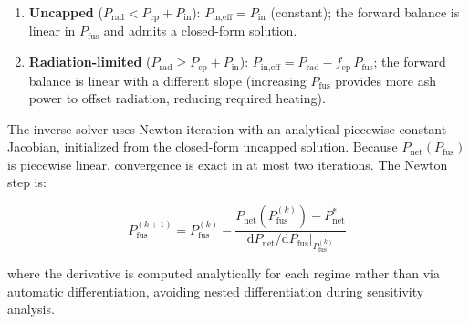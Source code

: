 \documentclass{article}
\begin{document}
\begin{enumerate}
\item \textbf{Uncapped} ($P_{\text{rad}} < P_{\text{cp}} + P_{\text{in}}$):
  $P_{\text{in,eff}} = P_{\text{in}}$ (constant); the forward balance
  is linear in $P_{\text{fus}}$ and admits a closed-form solution.
\item \textbf{Radiation-limited} ($P_{\text{rad}} \geq P_{\text{cp}} + P_{\text{in}}$):
  $P_{\text{in,eff}} = P_{\text{rad}} - f_{\text{cp}}\,P_{\text{fus}}$;
  the forward balance is linear with a different slope (increasing
  $P_{\text{fus}}$ provides more ash power to offset radiation, reducing
  required heating).
\end{enumerate}

\noindent The inverse solver uses Newton iteration with an analytical
piecewise-constant Jacobian, initialized from the closed-form uncapped
solution.  Because $P_{\text{net}}(P_{\text{fus}})$ is piecewise linear,
convergence is exact in at most two iterations.  The Newton step is:

\begin{equation}
P_{\text{fus}}^{(k+1)} = P_{\text{fus}}^{(k)}
  - \frac{P_{\text{net}}(P_{\text{fus}}^{(k)}) - P_{\text{net}}^*}
         {\mathrm{d}P_{\text{net}}/\mathrm{d}P_{\text{fus}}\big|_{P_{\text{fus}}^{(k)}}}
\end{equation}

\noindent where the derivative is computed analytically for each regime
rather than via automatic differentiation, avoiding nested
differentiation during sensitivity analysis.



\end{document}

